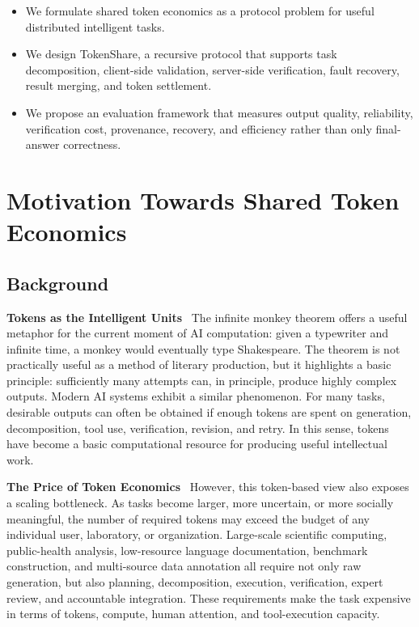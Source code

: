 \documentclass{article}
\theoremstyle{plain}
\begin{document}
\begin{itemize}
\item We formulate shared token economics as a protocol problem for useful distributed intelligent tasks.
 \item We design TokenShare, a recursive protocol that supports task decomposition, client-side validation, server-side verification, fault recovery, result merging, and token settlement.
\item  We propose an evaluation framework that measures output quality, reliability, verification cost, provenance, recovery, and efficiency rather than only final-answer correctness.
\end{itemize}






\section{Motivation Towards Shared Token Economics}


\subsection{Background}

\textbf{Tokens as the Intelligent Units}~
The infinite monkey theorem offers a useful metaphor for the current moment of AI computation: given a typewriter and infinite time, a monkey would eventually type Shakespeare. The theorem is not practically useful as a method of literary production, but it highlights a basic principle: sufficiently many attempts can, in principle, produce highly complex outputs. Modern AI systems exhibit a similar phenomenon. For many tasks, desirable outputs can often be obtained if enough tokens are spent on generation, decomposition, tool use, verification, revision, and retry. In this sense, tokens have become a basic computational resource for producing useful intellectual work.

\textbf{The Price of Token Economics}~
However, this token-based view also exposes a scaling bottleneck. As tasks become larger, more uncertain, or more socially meaningful, the number of required tokens may exceed the budget of any individual user, laboratory, or organization. Large-scale scientific computing, public-health analysis, low-resource language documentation, benchmark construction, and multi-source data annotation all require not only raw generation, but also planning, decomposition, execution, verification, expert review, and accountable integration. These requirements make the task expensive in terms of tokens, compute, human attention, and tool-execution capacity.
\end{document}
